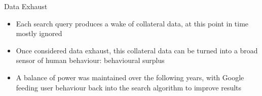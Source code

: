 \documentclass[aspectratio=169]{beamer}
\begin{document}
    {%
    \begin{frame}{Data Exhaust}
        \begin{itemize}
            \item Each search query produces a wake of collateral data, at this
                point in time mostly ignored
            \pause{}
            \item Once considered \alert{data exhaust}, this collateral data
                can be turned into a broad sensor of human behaviour:
                \alert{behavioural surplus}
            \pause{}
            \item A balance of power was maintained over the following years,
                with Google feeding user behaviour back into the search
                algorithm to improve results
        \end{itemize}
    \end{frame}
    }
\end{document}
